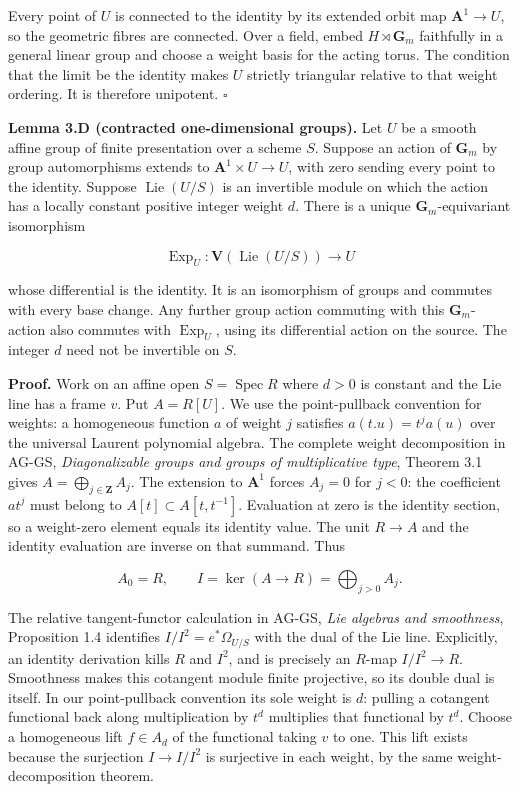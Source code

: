 \documentclass[11pt,a4paper,openany]{report}
\begin{document}
Every point of \(U\) is connected to the identity by its extended orbit map \(\mathbf A^1\to U\), so the geometric fibres are connected. Over a field, embed \(H\rtimes\mathbf G_m\) faithfully in a general linear group and choose a weight basis for the acting torus. The condition that the limit be the identity makes \(U\) strictly triangular relative to that weight ordering. It is therefore unipotent. \(\square\)

\textbf{Lemma 3.D (contracted one-dimensional groups).} Let \(U\) be a smooth affine group of finite presentation over a scheme \(S\). Suppose an action of \(\mathbf G_m\) by group automorphisms extends to \(\mathbf A^1\times U\to U\), with zero sending every point to the identity. Suppose \(\operatorname{Lie}(U/S)\) is an invertible module on which the action has a locally constant positive integer weight \(d\). There is a unique \(\mathbf G_m\)-equivariant isomorphism

\[
\operatorname{Exp}_U:\mathbf V(\operatorname{Lie}(U/S))\longrightarrow U
\]

whose differential is the identity. It is an isomorphism of groups and commutes with every base change. Any further group action commuting with this \(\mathbf G_m\)-action also commutes with \(\operatorname{Exp}_U\), using its differential action on the source. The integer \(d\) need not be invertible on \(S\).

\textbf{Proof.} Work on an affine open \(S=\operatorname{Spec}R\) where \(d>0\) is constant and the Lie line has a frame \(v\). Put \(A=R[U]\). We use the point-pullback convention for weights: a homogeneous function \(a\) of weight \(j\) satisfies \(a(t.u)=t^j a(u)\) over the universal Laurent polynomial algebra. The complete weight decomposition in AG-GS, \emph{Diagonalizable groups and groups of multiplicative type}, Theorem 3.1 gives \(A=\bigoplus_{j\in\mathbf Z}A_j\). The extension to \(\mathbf A^1\) forces \(A_j=0\) for \(j<0\): the coefficient \(a t^j\) must belong to \(A[t]\subset A[t,t^{-1}]\). Evaluation at zero is the identity section, so a weight-zero element equals its identity value. The unit \(R\to A\) and the identity evaluation are inverse on that summand. Thus

\[
A_0=R,\qquad I=\ker(A\to R)=\bigoplus_{j>0}A_j.
\]

The relative tangent-functor calculation in AG-GS, \emph{Lie algebras and smoothness}, Proposition 1.4 identifies \(I/I^2=e^*\Omega_{U/S}\) with the dual of the Lie line. Explicitly, an identity derivation kills \(R\) and \(I^2\), and is precisely an \(R\)-map \(I/I^2\to R\). Smoothness makes this cotangent module finite projective, so its double dual is itself. In our point-pullback convention its sole weight is \(d\): pulling a cotangent functional back along multiplication by \(t^d\) multiplies that functional by \(t^d\). Choose a homogeneous lift \(f\in A_d\) of the functional taking \(v\) to one. This lift exists because the surjection \(I\to I/I^2\) is surjective in each weight, by the same weight-decomposition theorem.
\end{document}
